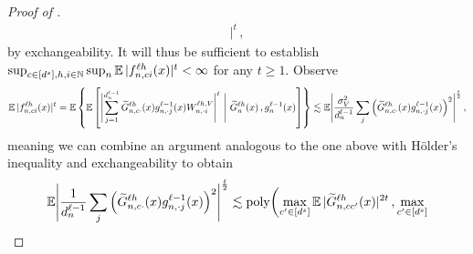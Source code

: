 \begin{proof}[Proof of ]
\begin{align*}
        |^{t}
        \, ,
    \end{align*}
    by exchangeability.
    It will thus be sufficient to establish 
    $
        \sup_{c \in [d^s], h, i \in \mathbb{N}}
        \sup_{n}
        \operatorname*{\mathbb{E}} |
            {f}^{\ell h}_{n, c i}{(x)}
        |^{t}
        <
        \infty
    $
    for any $t \geq 1$.
    Observe
    \begin{align*}
        \operatorname*{\mathbb{E}} |
            {f}^{\ell h}_{n, c i}{(x)}
        |^{t}
        =
        \operatorname*{\mathbb{E}} \left\{
            \operatorname*{\mathbb{E}} \left[
                \Biggl|
                    \sum_{j = 1}^{d_{n}^{\ell - 1}}
                        \widetilde{G}_{n, c \cdot}^{\ell h} (x)
                        {g}^{\ell - 1}_{n, \cdot j}{(x)}
                        W_{n, \cdot i}^{\ell h, V}
                \Biggr|^{t}
                \, \, 
                \Bigg\vert
                \, \,
                \widetilde{G}_{n}^{\ell h} (x) \, ,
                {g}^{\ell - 1}_{n}{(x)}
            \right]
        \right\}
        \lesssim
        \operatorname*{\mathbb{E}} \Biggl|
            \frac{\sigma_{V}^2}{d_{n}^{\ell - 1}}
            \sum_{j}
                \left(
                    \widetilde{G}_{n, c \cdot}^{\ell h} (x)
                    {g}^{\ell - 1}_{n, \cdot j}{(x)}
                \right)^2
        \Biggr|^{\frac{t}{2}}
        \, ,
    \end{align*}
    meaning we can combine an argument analogous to the one above with H{\" o}lder's inequality and exchangeability to obtain
    \begin{align*}
        \E \Biggl|
            \frac{1}{\layerDimension{\depthSymbol - 1}}
            \sum_{j}
                \left(
                    \tildeLogitN{\sequenceVariable, c \cdot}{\depthSymbol\headIndex}{\inputSymbol}
                    \indexedActivity{\depthSymbol - 1}{\sequenceVariable, \cdot j}{\inputSymbol}
                \right)^2
        \Biggr|^{\frac{t}{2}}
        \lesssim
        \poly \biggl(
            \max_{c' \in [\spatialDimension]}
            \E |
                \tildeLogitN{\sequenceVariable, c c'}{\depthSymbol\headIndex}{\inputSymbol}
            |^{2t}
            \, ,
            \max_{c' \in [\spatialDimension]}

\end{align*}
\end{proof}
